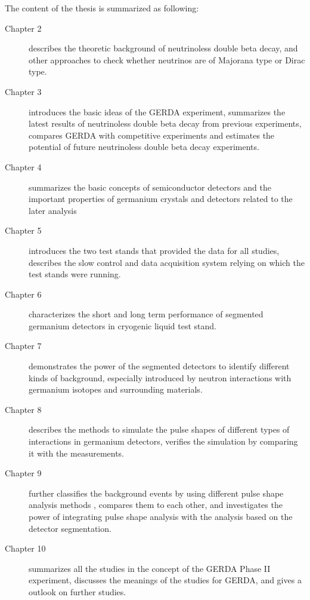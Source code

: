 The content of the thesis is summarized as following:
\begin{description}
\item[Chapter 2] describes the theoretic background of neutrinoless
  double beta decay, and other approaches to check whether neutrinos
  are of Majorana type or Dirac type.
\item[Chapter 3] introduces the basic ideas of the GERDA experiment,
  summarizes the latest results of neutrinoless double beta decay from
  previous experiments, compares GERDA with competitive experiments
  and estimates the potential of future neutrinoless double beta decay
  experiments.
\item[Chapter 4] summarizes the basic concepts of semiconductor
  detectors and the important properties of germanium crystals and
  detectors related to the later analysis
\item[Chapter 5] introduces the two test stands that provided the data
  for all studies, describes the slow control and data acquisition
  system relying on which the test stands were running.
\item[Chapter 6] characterizes the short and long term performance of
  segmented germanium detectors in cryogenic liquid test stand.
\item[Chapter 7] demonstrates the power of the segmented detectors to
  identify different kinds of background, especially introduced by
  neutron interactions with germanium isotopes and surrounding
  materials.
\item[Chapter 8] describes the methods to simulate the pulse shapes of
  different types of interactions in germanium detectors, verifies the
  simulation by comparing it with the measurements.
\item[Chapter 9] further classifies the background events by using
  different pulse shape analysis methods , compares them to each
  other, and investigates the power of integrating pulse shape
  analysis with the analysis based on the detector segmentation.
\item[Chapter 10] summarizes all the studies in the concept of the
  GERDA Phase II experiment, discusses the meanings of the studies for
  GERDA, and gives a outlook on further studies.
\end{description}

